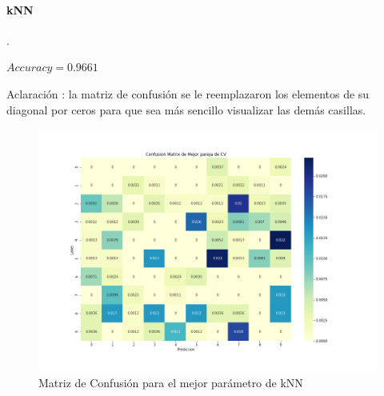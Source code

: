 \paragraph{kNN}.
\par 
\vspace{0.5cm}
$Accuracy = 0.9661 $
\par
\vspace{0.5cm}
Aclaración : la matriz de confusión se le reemplazaron los elementos de su diagonal por ceros para que sea más sencillo visualizar las demás casillas.
\begin{figure}[H]
    \centering
    \includegraphics[width=14cm]{images/ConfMatrix_knn.png}%
    \qquad
    \caption{Matriz de Confusión para el mejor parámetro de kNN }
    \label{knn_MatrizConf}%
\end{figure}



